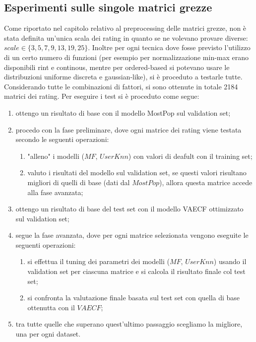 \subsection{Esperimenti sulle singole matrici grezze}
Come riportato nel capitolo relativo al preprocessing delle matrici grezze, non è stata definita un'unica scala dei rating in quanto se ne volevano provare diverse: $scale \in \{3, 5, 7, 9, 13, 19, 25\}$.
Inoltre per ogni tecnica dove fosse previsto l'utilizzo di un certo numero di funzioni (per esempio per normalizzazione min-max erano disponibili rint e continous, mentre per ordered-based si potevano usare le distribuzioni uniforme discreta e gaussian-like), si è proceduto a testarle tutte.
Considerando tutte le combinazioni di fattori, si sono ottenute in totale 2184 matrici dei rating.
Per eseguire i test si è proceduto come segue:
\begin{enumerate}
    \item ottengo un risultato di base con il modello MostPop sul validation set;
    \item procedo con la fase preliminare, dove ogni matrice dei rating viene testata secondo le seguenti operazioni:
    \begin{enumerate}
        \item "alleno" i modelli ($MF$, $UserKnn$) con valori di deafult con il training set;
        \item valuto i risultati del modello sul validation set, se questi valori risultano migliori di quelli di base (dati dal $MostPop$), allora questa matrice accede alla fase avanzata;
    \end{enumerate}
    \item ottengo un risultato di base del test set con il modello VAECF ottimizzato sul validation set;
    \item segue la fase avanzata, dove per ogni matrice selezionata vengono eseguite le seguenti operazioni:
    \begin{enumerate}
        \item si effettua il tuning dei parametri dei modelli ($MF$, $UserKnn$) usando il validation set per ciascuna matrice e si calcola il risultato finale col test set;
        \item si confronta la valutazione finale basata sul test set con quella di base ottenutta con il $VAECF$;
    \end{enumerate}
    \item tra tutte quelle che superano quest'ultimo passaggio scegliamo la migliore, una per ogni dataset.
\end{enumerate}

